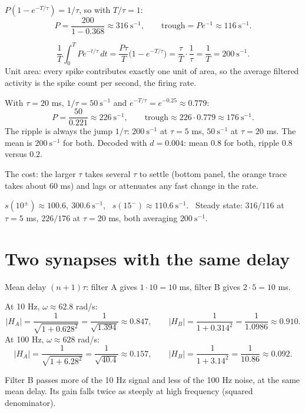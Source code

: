 \documentclass[11pt,letterpaper]{article}
\newcommand{\ans}[1]{\par\vspace{4pt}{\bfseries #1}\quad}
\begin{document}
\ans{(b)}
$P(1 - e^{-T/\tau}) = 1/\tau$, so with $T/\tau = 1$:
\[
P = \frac{200}{1 - 0.368} \approx 316\ \mathrm{s^{-1}}, \qquad \text{trough} = P e^{-1} \approx 116\ \mathrm{s^{-1}} .
\]

\ans{(c)}
\[
\frac1T \int_0^T P e^{-t/\tau}\,dt = \frac{P\tau}{T}\big(1 - e^{-T/\tau}\big) = \frac{\tau}{T}\cdot\frac{1}{\tau} = \frac1T = 200\ \mathrm{s^{-1}} .
\]
Unit area: every spike contributes exactly one unit of area, so the average filtered activity is the spike count per second, the firing rate.

\ans{(d)}
With $\tau = 20$ ms, $1/\tau = 50\ \mathrm{s^{-1}}$ and $e^{-T/\tau} = e^{-0.25} \approx 0.779$:
\[
P = \frac{50}{0.221} \approx 226\ \mathrm{s^{-1}}, \qquad \text{trough} \approx 226 \cdot 0.779 \approx 176\ \mathrm{s^{-1}} .
\]
The ripple is always the jump $1/\tau$: $200\ \mathrm{s^{-1}}$ at $\tau = 5$ ms, $50\ \mathrm{s^{-1}}$ at $\tau = 20$ ms. The mean is $200\ \mathrm{s^{-1}}$ for both. Decoded with $d = 0.004$: mean $0.8$ for both, ripple $0.8$ versus $0.2$.

The cost: the larger $\tau$ takes several $\tau$ to settle (bottom panel, the orange trace takes about 60 ms) and lags or attenuates any fast change in the rate.
\begin{result}
$s(10^\pm) \approx 100.6,\ 300.6\ \mathrm{s^{-1}}$, \ $s(15^-) \approx 110.6\ \mathrm{s^{-1}}$. \ Steady state: $316/116$ at $\tau = 5$ ms, $226/176$ at $\tau = 20$ ms, both averaging $200\ \mathrm{s^{-1}}$.
\end{result}

\section{Two synapses with the same delay}

\ans{(a)}
Mean delay $(n+1)\tau$: filter A gives $1 \cdot 10 = 10$ ms, filter B gives $2 \cdot 5 = 10$ ms.

\ans{(b)}
At 10 Hz, $\omega \approx 62.8$ rad/s:
\[
|H_A| = \frac{1}{\sqrt{1 + 0.628^2}} = \frac{1}{\sqrt{1.394}} \approx 0.847, \qquad
|H_B| = \frac{1}{1 + 0.314^2} = \frac{1}{1.0986} \approx 0.910 .
\]
At 100 Hz, $\omega \approx 628$ rad/s:
\[
|H_A| = \frac{1}{\sqrt{1 + 6.28^2}} = \frac{1}{\sqrt{40.4}} \approx 0.157, \qquad
|H_B| = \frac{1}{1 + 3.14^2} = \frac{1}{10.86} \approx 0.092 .
\]

\ans{(c)}
Filter B passes more of the 10 Hz signal and less of the 100 Hz noise, at the same mean delay. Its gain falls twice as steeply at high frequency (squared denominator).
\end{document}
